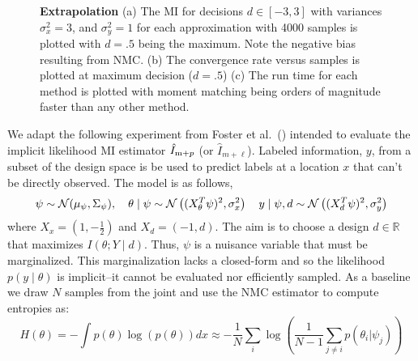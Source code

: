 \begin{figure*}[!t]
    \centering
    \hspace*{-5mm}
    \hspace*{-7mm}
    \hspace*{-7mm}
    \caption{\small \textbf{Extrapolation} (a) The MI for decisions $d
      \in [-3,3]$ with variances $\sigma_x^2 = 3$, and $\sigma_y^2=1$
      for each approximation with 4000 samples is plotted with $d=.5$
      being the maximum. Note the negative bias resulting from
      NMC. (b) The convergence rate versus samples is plotted at
      maximum decision ($d=.5$) (c) The run time for each method is
      plotted with moment matching being orders of magnitude faster than
      any other method.}
    \label{fig:Extrapolation}
\end{figure*}

We adapt the following experiment from Foster et
al.~(\citeyear{Foster2019}) intended to evaluate the implicit
likelihood MI estimator $\hat{I}_{\text{m}+p}$ (or $\hat{I}_{m+\ell}$).  Labeled
information, $y$, from a subset of the design space is be used to
predict labels at a location $x$ that can't be directly observed. The
model is as follows,
\[
 \psi\sim \mathcal{N}(\mu_\psi, \Sigma_\psi), \quad  \theta \mid \psi \sim \mathcal{N}\left( (X_\theta^T \psi)^2, \sigma_x^2 \right) \quad y\mid\psi,d \sim \mathcal{N}\left( (X_d^T \psi)^2, \sigma_y^2 \right)
\]
where $X_x = (1,-\frac{1}{2})$ and $X_d = (-1,d)$.  The aim is to
choose a design $d \in \mathbb{R}$ that maximizes $I(\theta ; Y \mid
d)$.  Thus, $\psi$ is a nuisance variable that must be marginalized.
This marginalization lacks a closed-form and so the likelihood $p(y
\mid \theta)$ is implicit--it cannot be evaluated nor efficiently
sampled.  As a baseline we draw $N$ samples from the joint and use the
NMC estimator to compute entropies as:
\begin{equation}
    H(\theta)= -\int p(\theta)\log(p(\theta))dx \approx -\dfrac{1}{N}\sum_i \log\left(\dfrac{1}{N-1}\sum_{j\neq i}p(\theta_i|\psi_j)\right)
    \label{eq:NMCentropy}
\end{equation}

